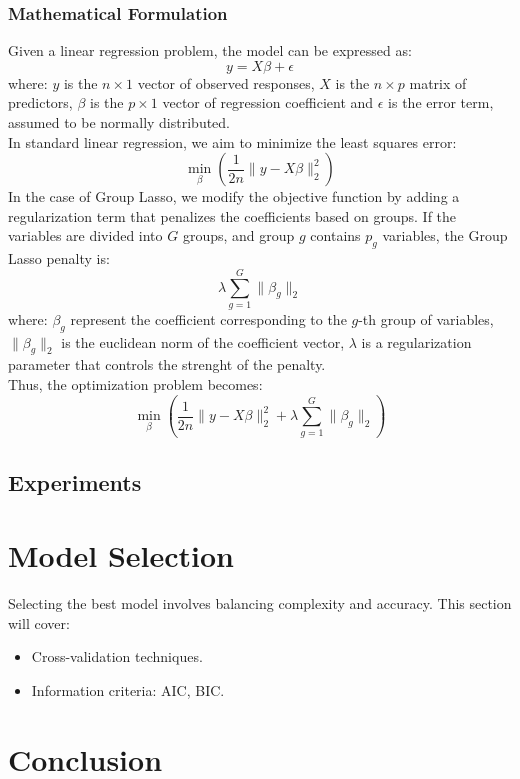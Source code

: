 \documentclass[a4paper, 12pt]{article}
\begin{document}
\subsubsection{Mathematical Formulation}
Given a linear regression problem, the model can be expressed as:
\begin{equation}
y=X\beta + \epsilon
\end{equation}
where: $y$ is the $n \times 1$ vector of observed responses, $X$ is the $n \times p$ matrix of predictors, $\beta$ is the $p \times 1$ vector of regression coefficient and $\epsilon$ is the error term, assumed to be normally distributed.\\
In standard linear regression, we aim to minimize the least squares error:
\begin{equation}
\min_{\beta}\left (\frac{1}{2n}\lVert y-X\beta\rVert^{2}_{2} \right)
\end{equation}
In the case of Group Lasso, we modify the objective function by adding a regularization term that penalizes the coefficients based on groups. If the variables are divided into $G$ groups, and group $g$ contains $p_{g}$ variables, the Group Lasso penalty is:
\begin{equation}
\lambda \sum_{g=1}^{G}\lVert \beta_{g} \rVert_{2}
\end{equation}
where: $\beta_g$ represent the coefficient corresponding to the $g$-th group of variables, $\lVert \beta_g \rVert_2$ is the euclidean norm of the coefficient vector, $\lambda$ is a regularization parameter that controls the strenght of the penalty.\\
Thus, the optimization problem becomes:
\begin{equation}
\min_{\beta}\left (\frac{1}{2n}\lVert y-X\beta\rVert^{2}_{2} + \lambda \sum_{g=1}^{G}\lVert \beta_{g} \rVert_{2}\right)
\end{equation}
\subsection{Experiments}

\section{Model Selection}
\noindent
Selecting the best model involves balancing complexity and accuracy. This section will cover:
\begin{itemize}
    \item Cross-validation techniques.
    \item Information criteria: AIC, BIC.
\end{itemize}

\section{Conclusion}
\noindent

% 
% 
\end{document}
